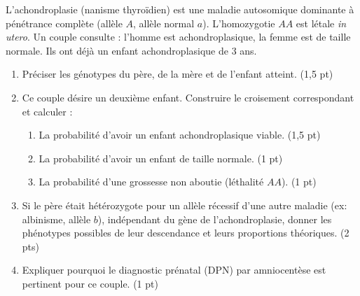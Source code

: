 \documentclass[11pt]{article}
\begin{document}
\begin{exercice}
L'achondroplasie (nanisme thyroïdien) est une maladie autosomique dominante à pénétrance complète (allèle $A$, allèle normal $a$). L'homozygotie $AA$ est létale \textit{in utero}. Un couple consulte : l'homme est achondroplasique, la femme est de taille normale. Ils ont déjà un enfant achondroplasique de 3 ans.
\begin{enumerate}
    \item Préciser les génotypes du père, de la mère et de l'enfant atteint. (1,5 pt)
    \item Ce couple désire un deuxième enfant. Construire le croisement correspondant et calculer :
    \begin{enumerate}
        \item La probabilité d'avoir un enfant achondroplasique viable. (1,5 pt)
        \item La probabilité d'avoir un enfant de taille normale. (1 pt)
        \item La probabilité d'une grossesse non aboutie (léthalité $AA$). (1 pt)
    \end{enumerate}
    \item Si le père était hétérozygote pour un allèle récessif d'une autre maladie (ex: albinisme, allèle $b$), indépendant du gène de l'achondroplasie, donner les phénotypes possibles de leur descendance et leurs proportions théoriques. (2 pts)
    \item Expliquer pourquoi le diagnostic prénatal (DPN) par amniocentèse est pertinent pour ce couple. (1 pt)
\end{enumerate}
\end{exercice}
\end{document}
